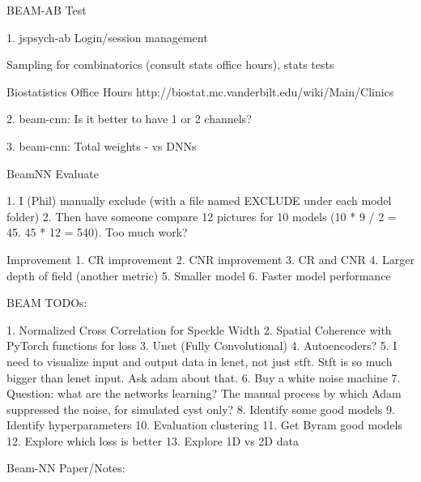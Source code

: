 \documentclass{article}
\begin{document}
BEAM-AB Test

1. jspsych-ab Login/session management

Sampling for combinatorics (consult stats office hours), stats tests

Biostatistics Office Hours http://biostat.mc.vanderbilt.edu/wiki/Main/Clinics

2. beam-cnn: Is it better to have 1 or 2 channels?

3. beam-cnn: Total weights - vs DNNs

BeamNN Evaluate

1. I (Phil) manually exclude (with a file named EXCLUDE under each model folder)
2. Then have someone compare 12 pictures for 10 models (10 * 9 / 2 = 45. 45 * 12 = 540). Too much work?


Improvement
1. CR improvement
2. CNR improvement
3. CR and CNR
4. Larger depth of field (another metric)
5. Smaller model
6. Faster model performance


BEAM TODOs:

1. Normalized Cross Correlation for Speckle Width
2. Spatial Coherence with PyTorch functions for loss
3. Unet (Fully Convolutional)
4. Autoencoders?
5. I need to visualize input and output data in lenet, not just stft. Stft is so much bigger than lenet input. Ask adam about that.
6. Buy a white noise machine
7. Question: what are the networks learning? The manual process by which Adam suppressed the noise, for simulated cyst only?
8. Identify some good models
9. Identify hyperparameters
10. Evaluation clustering
11. Get Byram good models
12. Explore which loss is better
13. Explore 1D vs 2D data


Beam-NN Paper/Notes:
\end{document}
